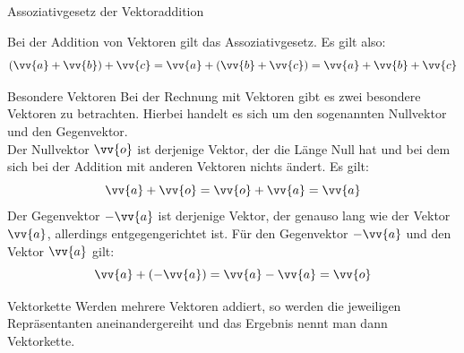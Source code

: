 \begin{satz}{Assoziativgesetz der Vektoraddition}{}\label{assivekadd}
\begin{center}
 Bei der Addition von Vektoren gilt das Assoziativgesetz. Es gilt also:
 $$(\vv{a} + \vv{b}) + \vv{c} = \vv{a} + (\vv{b} + \vv{c}) = \vv{a} + \vv{b} +\vv{c}$$
\end{center}
\end{satz}
\begin{b8d}{Besondere Vektoren}{}
Bei der Rechnung mit Vektoren gibt es zwei besondere Vektoren zu betrachten. Hierbei handelt es sich um den sogenannten Nullvektor und den Gegenvektor.\\
Der Nullvektor $\vv{o}$ ist derjenige Vektor, der die Länge Null hat und bei dem sich bei der Addition mit anderen Vektoren nichts ändert. Es gilt: $$\vv{a} +\vv{o} = \vv{o} +\vv{a} = \vv{a}$$
Der Gegenvektor $-\vv{a}$ ist derjenige Vektor, der genauso lang wie der Vektor $\vv{a}$, allerdings entgegengerichtet ist. Für den Gegenvektor $-\vv{a}$ und den Vektor $\vv{a}$ gilt: $$\vv{a} +( -\vv{a} ) =\vv{a}-\vv{a}= \vv{o}$$
\end{b8d}
\begin{bem}{Vektorkette}{}
Werden mehrere Vektoren addiert, so werden die jeweiligen Repräsentanten aneinandergereiht und das Ergebnis nennt man dann Vektorkette.
\end{bem}
